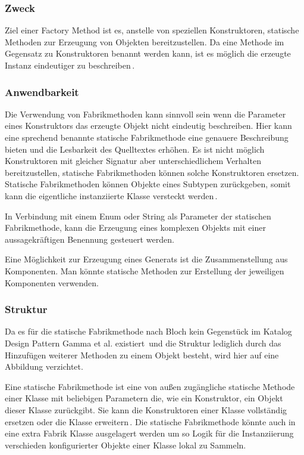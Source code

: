 \documentclass[12pt,oneside,a4paper,parskip]{scrbook}
\begin{document}
\subsubsection{Zweck}

Ziel einer Factory Method ist es, anstelle von speziellen Konstruktoren,  statische Methoden zur Erzeugung von Objekten bereitzustellen. Da eine Methode im Gegensatz zu Konstruktoren benannt werden kann, ist es möglich die erzeugte Instanz eindeutiger zu beschreiben\,\cite[S. 5f]{bloch2017}. 

\subsubsection{Anwendbarkeit}

Die Verwendung von Fabrikmethoden kann sinnvoll sein wenn die Parameter eines Konstruktors das erzeugte Objekt nicht eindeutig beschreiben. Hier kann eine sprechend benannte statische Fabrikmethode eine genauere Beschreibung bieten und die Lesbarkeit des Quelltextes erhöhen. Es ist nicht möglich Konstruktoren mit gleicher Signatur aber unterschiedlichem Verhalten bereitzustellen, statische Fabrikmethoden können solche Konstruktoren ersetzen. Statische Fabrikmethoden können Objekte eines Subtypen zurückgeben, somit kann die eigentliche instanziierte Klasse versteckt werden\,\cite[S. 5ff]{bloch2017}.

In Verbindung mit einem Enum oder String als Parameter der statischen Fabrikmethode, kann die Erzeugung eines komplexen Objekts mit einer aussagekräftigen Benennung gesteuert werden.

Eine Möglichkeit zur Erzeugung eines Generats ist die Zusammenstellung aus Komponenten. Man könnte statische Methoden zur Erstellung der jeweiligen Komponenten verwenden.

\subsubsection{Struktur}

Da es für die statische Fabrikmethode nach Bloch kein Gegenstück im Katalog Design Pattern Gamma et al. existiert\,\cite[S. 5]{bloch2017} und die Struktur lediglich durch das Hinzufügen weiterer Methoden zu einem Objekt besteht, wird hier auf eine Abbildung verzichtet. 

Eine statische Fabrikmethode ist eine von außen zugängliche statische Methode einer Klasse mit beliebigen Parametern die, wie ein Konstruktor, ein Objekt dieser Klasse zurückgibt. Sie kann die Konstruktoren einer Klasse vollständig ersetzen oder die Klasse erweitern\,\cite[S. 5f]{bloch2017}. Die statische Fabrikmethode könnte auch in eine extra Fabrik Klasse ausgelagert werden um so Logik für die Instanziierung verschieden konfigurierter Objekte einer Klasse lokal zu Sammeln.
\end{document}
